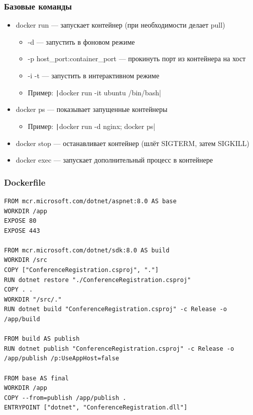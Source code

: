 \documentclass{../../slides-style}
\begin{document}
    \begin{frame}
        \frametitle{Базовые команды}
        \begin{itemize}
            \item docker run --- запускает контейнер (при необходимости делает pull)
            \begin{itemize}
                \item -d --- запустить в фоновом режиме
                \item -p host\_port:container\_port --- прокинуть порт из контейнера на хост
                \item -i -t --- запустить в интерактивном режиме
                \item Пример: \texttt|docker run -it ubuntu /bin/bash|
            \end{itemize}
            \item docker ps --- показывает запущенные контейнеры
            \begin{itemize}
                \item Пример: \texttt|docker run -d nginx; docker ps|
            \end{itemize}
            \item docker stop --- останавливает контейнер (шлёт SIGTERM, затем SIGKILL)
            \item docker exec --- запускает дополнительный процесс в контейнере
        \end{itemize}
    \end{frame}

    \begin{frame}[fragile]
        \frametitle{Dockerfile}
        \begin{scriptsize}
            \begin{verbatim}
FROM mcr.microsoft.com/dotnet/aspnet:8.0 AS base
WORKDIR /app
EXPOSE 80
EXPOSE 443

FROM mcr.microsoft.com/dotnet/sdk:8.0 AS build
WORKDIR /src
COPY ["ConferenceRegistration.csproj", "."]
RUN dotnet restore "./ConferenceRegistration.csproj"
COPY . .
WORKDIR "/src/."
RUN dotnet build "ConferenceRegistration.csproj" -c Release -o /app/build

FROM build AS publish
RUN dotnet publish "ConferenceRegistration.csproj" -c Release -o /app/publish /p:UseAppHost=false

FROM base AS final
WORKDIR /app
COPY --from=publish /app/publish .
ENTRYPOINT ["dotnet", "ConferenceRegistration.dll"]
            \end{verbatim}
        \end{scriptsize}
    \end{frame}
\end{document}
